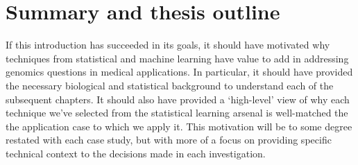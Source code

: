 \documentclass[thesis.tex]{subfiles}
\begin{document}



\section{Summary and thesis outline}
If this introduction has succeeded in its goals, it should have motivated why techniques from statistical and machine learning have value to add in addressing genomics questions in medical applications. In particular, it should have provided the necessary biological and statistical background to understand each of the subsequent chapters. It should also have provided a `high-level' view of why each technique we've selected from the statistical learning arsenal is well-matched the the application case to which we apply it. This motivation will be to some degree restated with each case study, but with more of a focus on providing specific technical context to the decisions made in each investigation.
\end{document}
